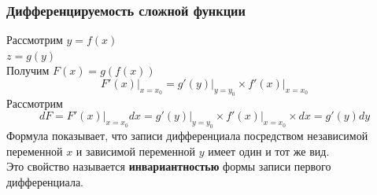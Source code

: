 \documentclass[12pt]{article}
\begin{document}
    \subsubsection*{Дифференцируемость сложной функции}
    \noindent Рассмотрим $y = f(x)$\\
    $z = g(y)$\\
    Получим $F(x) = g(f(x))$
    \[ F'(x)\Big|_{x=x_0} = g'(y)\Big|_{y=y_0} \times f'(x)\Big|_{x=x_0} \]
    Рассмотрим
    \[ dF = F'(x)\Big|_{x=x_0}dx = g'(y)\Big|_{y=y_0} \times f'(x)\Big|_{x=x_0} \times dx = g'(y)dy \]
    Формула показывает, что записи дифференциала посредством независимой переменной $x$ и зависимой переменной $y$ имеет один и тот же вид.\\
    Это свойство называется \textbf{инвариантностью} формы записи первого дифференциала.
\end{document}
